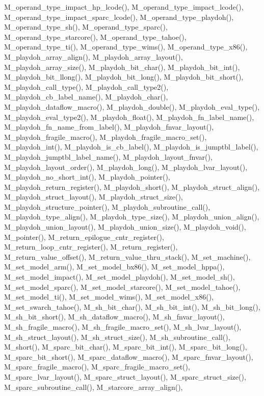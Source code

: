 M\_\-operand\_\-type\_\-impact\_\-hp\_\-lcode(), M\_\-operand\_\-type\_\-impact\_\-lcode(), M\_\-operand\_\-type\_\-impact\_\-sparc\_\-lcode(), M\_\-operand\_\-type\_\-playdoh(), M\_\-operand\_\-type\_\-sh(), M\_\-operand\_\-type\_\-sparc(), M\_\-operand\_\-type\_\-starcore(), M\_\-operand\_\-type\_\-tahoe(), M\_\-operand\_\-type\_\-ti(), M\_\-operand\_\-type\_\-wims(), M\_\-operand\_\-type\_\-x86(), M\_\-playdoh\_\-array\_\-align(), M\_\-playdoh\_\-array\_\-layout(), M\_\-playdoh\_\-array\_\-size(), M\_\-playdoh\_\-bit\_\-char(), M\_\-playdoh\_\-bit\_\-int(), M\_\-playdoh\_\-bit\_\-llong(), M\_\-playdoh\_\-bit\_\-long(), M\_\-playdoh\_\-bit\_\-short(), M\_\-playdoh\_\-call\_\-type(), M\_\-playdoh\_\-call\_\-type2(), M\_\-playdoh\_\-cb\_\-label\_\-name(), M\_\-playdoh\_\-char(), M\_\-playdoh\_\-dataflow\_\-macro(), M\_\-playdoh\_\-double(), M\_\-playdoh\_\-eval\_\-type(), M\_\-playdoh\_\-eval\_\-type2(), M\_\-playdoh\_\-float(), M\_\-playdoh\_\-fn\_\-label\_\-name(), M\_\-playdoh\_\-fn\_\-name\_\-from\_\-label(), M\_\-playdoh\_\-fnvar\_\-layout(), M\_\-playdoh\_\-fragile\_\-macro(), M\_\-playdoh\_\-fragile\_\-macro\_\-set(), M\_\-playdoh\_\-int(), M\_\-playdoh\_\-is\_\-cb\_\-label(), M\_\-playdoh\_\-is\_\-jumptbl\_\-label(), M\_\-playdoh\_\-jumptbl\_\-label\_\-name(), M\_\-playdoh\_\-layout\_\-fnvar(), M\_\-playdoh\_\-layout\_\-order(), M\_\-playdoh\_\-long(), M\_\-playdoh\_\-lvar\_\-layout(), M\_\-playdoh\_\-no\_\-short\_\-int(), M\_\-playdoh\_\-pointer(), M\_\-playdoh\_\-return\_\-register(), M\_\-playdoh\_\-short(), M\_\-playdoh\_\-struct\_\-align(), M\_\-playdoh\_\-struct\_\-layout(), M\_\-playdoh\_\-struct\_\-size(), M\_\-playdoh\_\-structure\_\-pointer(), M\_\-playdoh\_\-subroutine\_\-call(), M\_\-playdoh\_\-type\_\-align(), M\_\-playdoh\_\-type\_\-size(), M\_\-playdoh\_\-union\_\-align(), M\_\-playdoh\_\-union\_\-layout(), M\_\-playdoh\_\-union\_\-size(), M\_\-playdoh\_\-void(), M\_\-pointer(), M\_\-return\_\-epilogue\_\-cntr\_\-register(), M\_\-return\_\-loop\_\-cntr\_\-register(), M\_\-return\_\-register(), M\_\-return\_\-value\_\-offset(), M\_\-return\_\-value\_\-thru\_\-stack(), M\_\-set\_\-machine(), M\_\-set\_\-model\_\-arm(), M\_\-set\_\-model\_\-bx86(), M\_\-set\_\-model\_\-hppa(), M\_\-set\_\-model\_\-impact(), M\_\-set\_\-model\_\-playdoh(), M\_\-set\_\-model\_\-sh(), M\_\-set\_\-model\_\-sparc(), M\_\-set\_\-model\_\-starcore(), M\_\-set\_\-model\_\-tahoe(), M\_\-set\_\-model\_\-ti(), M\_\-set\_\-model\_\-wims(), M\_\-set\_\-model\_\-x86(), M\_\-set\_\-swarch\_\-tahoe(), M\_\-sh\_\-bit\_\-char(), M\_\-sh\_\-bit\_\-int(), M\_\-sh\_\-bit\_\-long(), M\_\-sh\_\-bit\_\-short(), M\_\-sh\_\-dataflow\_\-macro(), M\_\-sh\_\-fnvar\_\-layout(), M\_\-sh\_\-fragile\_\-macro(), M\_\-sh\_\-fragile\_\-macro\_\-set(), M\_\-sh\_\-lvar\_\-layout(), M\_\-sh\_\-struct\_\-layout(), M\_\-sh\_\-struct\_\-size(), M\_\-sh\_\-subroutine\_\-call(), M\_\-short(), M\_\-sparc\_\-bit\_\-char(), M\_\-sparc\_\-bit\_\-int(), M\_\-sparc\_\-bit\_\-long(), M\_\-sparc\_\-bit\_\-short(), M\_\-sparc\_\-dataflow\_\-macro(), M\_\-sparc\_\-fnvar\_\-layout(), M\_\-sparc\_\-fragile\_\-macro(), M\_\-sparc\_\-fragile\_\-macro\_\-set(), M\_\-sparc\_\-lvar\_\-layout(), M\_\-sparc\_\-struct\_\-layout(), M\_\-sparc\_\-struct\_\-size(), M\_\-sparc\_\-subroutine\_\-call(), M\_\-starcore\_\-array\_\-align(), 